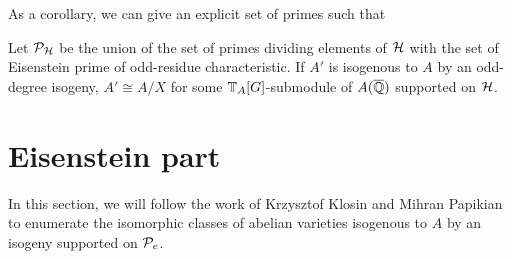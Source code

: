 \documentclass[thesis.tex]{subfiles}
\begin{document}
As a corollary, we can give an explicit set of primes such that %
\begin{corollary}
    Let $\P_\H$ be the union of the set of primes dividing elements of $\H$ with
    the set of Eisenstein prime of odd-residue characteristic. If $A'$ is
    isogenous to $A$ by an odd-degree isogeny, $A'\cong A/X$ for some
    $\TT_A[G]$-submodule of $A(\QQbar)$ supported on $\H$.
\end{corollary}

\section{Eisenstein part}%
\label{sec:eisenstein_part}

In this section, we will follow the work of Krzysztof Klosin and Mihran
Papikian to enumerate the isomorphic classes of abelian varieties isogenous to
$A$ by an isogeny supported on $\P_e$.
\end{document}
